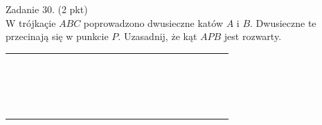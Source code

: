 \documentclass[10pt]{article}
\begin{document}
Zadanie 30. (2 pkt)\\
W trójkaçie \(A B C\) poprowadzono dwusieczne katów \(A\) i \(B\). Dwusieczne te przecinają się w punkcie \(P\). Uzasadnij, że kąt \(A P B\) jest rozwarty.

\begin{center}
\begin{tabular}{|c|c|c|c|c|c|c|c|c|c|c|c|c|c|c|c|c|c|c|c|c|c|c|}
\hline
 &  &  &  &  &  &  &  &  &  &  &  &  &  &  &  &  &  &  &  &  &  &  \\
\hline
 &  &  &  &  &  &  &  &  &  &  &  &  &  &  &  &  &  &  &  &  &  &  \\
\hline
 &  &  &  &  &  &  &  &  &  &  &  &  &  &  &  &  &  &  &  &  &  &  \\
\hline
 &  &  &  &  &  &  &  &  &  &  &  &  &  &  &  &  &  &  &  &  &  &  \\
\hline
 &  &  &  &  &  &  &  &  &  &  &  &  &  &  &  &  &  &  &  &  &  &  \\
\hline
 &  &  &  &  &  &  &  &  &  &  &  &  &  &  &  &  &  &  &  &  &  &  \\
\hline
 &  &  &  &  &  &  &  &  &  &  &  &  &  &  &  &  &  &  &  &  &  &  \\
\hline
 &  &  &  &  &  &  &  &  &  &  &  &  &  &  &  &  &  &  &  &  &  &  \\
\hline
 &  &  &  &  &  &  &  &  &  &  &  &  &  &  &  &  &  &  &  &  &  &  \\
\hline
 &  &  &  &  &  &  &  &  &  &  &  &  &  &  &  &  &  &  &  &  &  &  \\
\hline
 &  &  &  &  &  &  &  &  &  &  &  &  &  &  &  &  &  &  &  &  &  &  \\
\hline
 &  &  &  &  &  &  &  &  &  &  &  &  &  &  &  &  &  &  &  &  &  &  \\
\hline
 &  &  &  &  &  &  &  &  &  &  &  &  &  &  &  &  &  &  &  &  &  &  \\
\hline
 &  &  &  &  &  &  &  &  &  &  &  &  &  &  &  &  &  &  &  &  &  &  \\
\hline
 &  &  &  &  &  &  &  &  &  &  &  &  &  &  &  &  &  &  &  &  &  &  \\
\hline
 &  &  &  &  &  &  &  &  &  &  &  &  &  &  &  &  &  &  &  &  &  &  \\
\hline
 &  &  &  &  &  &  &  &  &  &  &  &  &  &  &  &  &  &  &  &  &  &  \\
\hline
 &  &  &  &  &  &  &  &  &  &  &  &  &  &  &  &  &  &  &  &  &  &  \\
\hline
 &  &  &  &  &  &  &  &  &  &  &  &  &  &  &  &  &  &  &  &  &  &  \\

\end{tabular}
\end{center}
\end{document}
